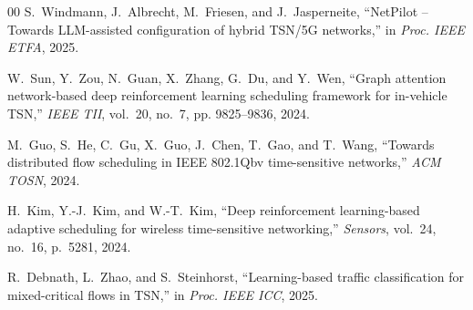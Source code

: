 \documentclass[UTF8]{ctexart}
\begin{document}
\begin{thebibliography}{00}
S.~Windmann, J.~Albrecht, M.~Friesen, and J.~Jasperneite,
``NetPilot -- Towards LLM-assisted configuration of hybrid TSN/5G networks,''
in \textit{Proc. IEEE ETFA}, 2025.

W.~Sun, Y.~Zou, N.~Guan, X.~Zhang, G.~Du, and Y.~Wen,
``Graph attention network-based deep reinforcement learning scheduling framework for in-vehicle TSN,''
\textit{IEEE TII}, vol.~20, no.~7, pp. 9825--9836, 2024.

M.~Guo, S.~He, C.~Gu, X.~Guo, J.~Chen, T.~Gao, and T.~Wang,
``Towards distributed flow scheduling in IEEE 802.1Qbv time-sensitive networks,''
\textit{ACM TOSN}, 2024.

H.~Kim, Y.-J.~Kim, and W.-T.~Kim,
``Deep reinforcement learning-based adaptive scheduling for wireless time-sensitive networking,''
\textit{Sensors}, vol.~24, no.~16, p.~5281, 2024.

R.~Debnath, L.~Zhao, and S.~Steinhorst,
``Learning-based traffic classification for mixed-critical flows in TSN,''
in \textit{Proc. IEEE ICC}, 2025.

\end{thebibliography}
\end{document}
